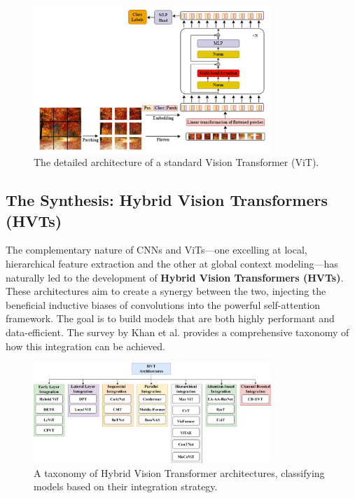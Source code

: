 \begin{figure}[H]
    \centering
    \includegraphics[width=0.8\textwidth]{archivos/figuras/ViT.jpg} 
    \caption{The detailed architecture of a standard Vision Transformer (ViT).}
    \label{fig:vit_arch}
\end{figure}

\subsection{The Synthesis: Hybrid Vision Transformers (HVTs)}
The complementary nature of CNNs and ViTs—one excelling at local, hierarchical feature extraction and the other at global context modeling—has naturally led to the development of \textbf{Hybrid Vision Transformers (HVTs)}. These architectures aim to create a synergy between the two, injecting the beneficial inductive biases of convolutions into the powerful self-attention framework. The goal is to build models that are both highly performant and data-efficient. The survey by Khan et al. provides a comprehensive taxonomy of how this integration can be achieved.

\begin{figure}[H]
    \centering
    \includegraphics[width=0.8\textwidth]{archivos/figuras/hvt.jpg} 
    \caption{A taxonomy of Hybrid Vision Transformer architectures, classifying models based on their integration strategy.}
    \label{fig:hvt_taxonomy}
\end{figure}


